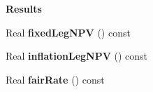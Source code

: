 \begin{Indent}{\bf Results}\par
\begin{DoxyCompactItemize}
\item 
Real {\bfseries fixed\+Leg\+N\+PV} () const \label{class_quant_lib_1_1_zero_coupon_inflation_swap_a0567720ed91cdabb583584890b218f34}

\item 
Real {\bfseries inflation\+Leg\+N\+PV} () const \label{class_quant_lib_1_1_zero_coupon_inflation_swap_a32a0fc942fc3879ed300b739f929e6c9}

\item 
Real {\bfseries fair\+Rate} () const \label{class_quant_lib_1_1_zero_coupon_inflation_swap_a15efde8258eb1f5af5335baca1ecaae1}

\end{DoxyCompactItemize}
\end{Indent}
